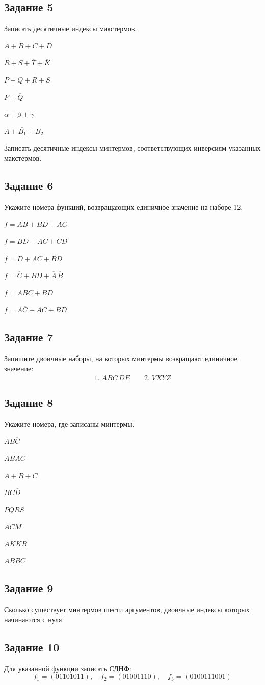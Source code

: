 \documentclass[a4paper,12pt,oneside]{article}
\newcommand{\Task}[1]{%
  \subsection*{#1}%
  \vspace{-0.2\baselineskip}%
}
\begin{document}
\Task{Задание 5}
Записать десятичные индексы макстермов.
\begin{numlist}
    \item $A+\overline{B}+C+D$
    \item $R+S+\overline{T}+\overline{K}$
    \item $P+Q+\overline{R}+S$
    \item $P+\overline{Q}$
    \item $\alpha+\overline{\beta}+\overline{\gamma}$
    \item $A+\overline{B_1}+B_2$
\end{numlist}
Записать десятичные индексы минтермов, соответствующих инверсиям указанных макстермов.

\Task{Задание 6}
Укажите номера функций, возвращающих единичное значение на наборе 12.
\begin{numlist}
    \item $f=A\overline{B}+B\overline{D}+\overline{A}C$
    \item $f=BD+AC+CD$
    \item $f=\overline{D}+\overline{A}C+\overline{B}D$
    \item $f=\overline{C}+BD+\overline{A}\,\overline{B}$
    \item $f=ABC+BD$
    \item $f=A\overline{C}+AC+BD$
\end{numlist}

\Task{Задание 7}
Запишите двоичные наборы, на которых минтермы возвращают единичное значение:
\[
1.\; AB\overline{C}\,\overline{D}E
\qquad
2.\; VX\overline{Y}Z
\]

\Task{Задание 8}
Укажите номера, где записаны минтермы.
\begin{numlist}
    \item $AB\overline{C}$
    \item $ABAC$
    \item $A+\overline{B}+C$
    \item $BC\overline{D}$
    \item $PQ\overline{R}S$
    \item $ACM$
    \item $AK\overline{K}B$
    \item $ABBC$
\end{numlist}

\Task{Задание 9}
Сколько существует минтермов шести аргументов, двоичные индексы которых начинаются с нуля.

\Task{Задание 10}
Для указанной функции записать СДНФ:
\[
f_1=(01101011),\quad f_2=(01001110),\quad f_3=(0100111001)
\]
\end{document}
